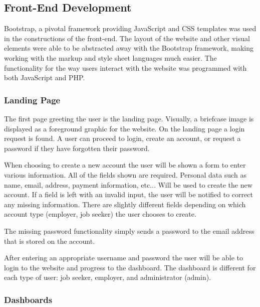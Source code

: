 \documentclass[11pt]{article}
\begin{document}
\newpage

\subsection{Front-End Development}

Bootstrap, a pivotal framework providing JavaScript and CSS templates was used in the constructions of the front-end. The layout of the website and other visual elements were able to be abstracted away with the Bootstrap framework, making working with the markup and style sheet languages much easier. The functionality for the way users interact with the website was programmed with both JavaScript and PHP.

\subsubsection{Landing Page}

The first page greeting the user is the landing page. Visually, a briefcase image is displayed as a foreground graphic for the website. On the landing page a login request is found. A user can proceed to login, create an account, or request a password if they have forgotten their password. \par
When choosing to create a new account the user will be shown a form to enter various information. All of the fields shown are required. Personal data such as name, email, address, payment information, etc... Will be used to create the new account. If a field is left with an invalid input, the user will be notified to correct any missing information. There are slightly different fields depending on which account type (employer, job seeker) the user chooses to create. \par
The missing password functionality simply sends a password to the email address that is stored on the account. \par
After entering an appropriate username and password the user will be able to login to the website and progress to the dashboard. The dashboard is different for each type of user: job seeker, employer, and administrator (admin).

\subsubsection{Dashboards}
\end{document}

